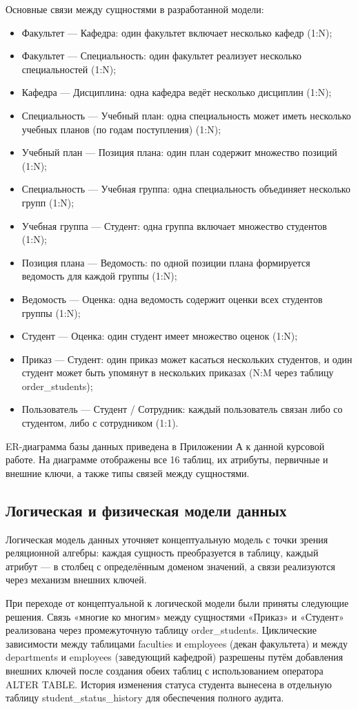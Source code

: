 \documentclass[14pt, a4paper]{extreport}
\begin{document}
Основные связи между сущностями в разработанной модели:
\begin{itemize}
    \item Факультет --- Кафедра: один факультет включает несколько кафедр (1:N);
    \item Факультет --- Специальность: один факультет реализует несколько специальностей (1:N);
    \item Кафедра --- Дисциплина: одна кафедра ведёт несколько дисциплин (1:N);
    \item Специальность --- Учебный план: одна специальность может иметь несколько учебных планов (по годам поступления) (1:N);
    \item Учебный план --- Позиция плана: один план содержит множество позиций (1:N);
    \item Специальность --- Учебная группа: одна специальность объединяет несколько групп (1:N);
    \item Учебная группа --- Студент: одна группа включает множество студентов (1:N);
    \item Позиция плана --- Ведомость: по одной позиции плана формируется ведомость для каждой группы (1:N);
    \item Ведомость --- Оценка: одна ведомость содержит оценки всех студентов группы (1:N);
    \item Студент --- Оценка: один студент имеет множество оценок (1:N);
    \item Приказ --- Студент: один приказ может касаться нескольких студентов, и один студент может быть упомянут в нескольких приказах (N:M через таблицу order\_students);
    \item Пользователь --- Студент / Сотрудник: каждый пользователь связан либо со студентом, либо с сотрудником (1:1).
\end{itemize}
ER-диаграмма базы данных приведена в Приложении А к данной курсовой работе. На диаграмме отображены все 16 таблиц, их атрибуты, первичные и внешние ключи, а также типы связей между сущностями.

\subsection{Логическая и физическая модели данных}
Логическая модель данных уточняет концептуальную модель с точки зрения реляционной алгебры: каждая сущность преобразуется в таблицу, каждый атрибут --- в столбец с определённым доменом значений, а связи реализуются через механизм внешних ключей.

При переходе от концептуальной к логической модели были приняты следующие решения. Связь «многие ко многим» между сущностями «Приказ» и «Студент» реализована через промежуточную таблицу order\_students. Циклические зависимости между таблицами faculties и employees (декан факультета) и между departments и employees (заведующий кафедрой) разрешены путём добавления внешних ключей после создания обеих таблиц с использованием оператора ALTER TABLE. История изменения статуса студента вынесена в отдельную таблицу student\_status\_history для обеспечения полного аудита.
\end{document}
